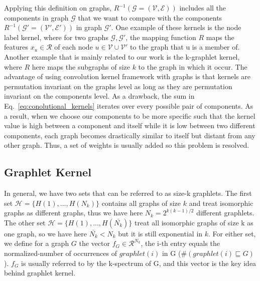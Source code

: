  Applying this definition on graphs, $R^{-1}(\mathcal{G}=(\mathcal{V},\mathcal{E}))$ includes all the components in graph $\mathcal{G}$  that we want to compare with the components $R^{-1}(\mathcal{G'}=(\mathcal{V}',\mathcal{E}'))$ in graph $\mathcal{G'}$. One example of these kernels is the node label kernel, where for two graphs $\mathcal{G}, \mathcal{G'}$, the mapping function $R$ maps the features $x_u\in \mathcal{R}$ of each node $u\in \mathcal{V}\cup \mathcal{V'}$ to the graph that u is a member of. Another example that is mainly related to our work is the k-graphlet kernel, where $R$ here maps the subgraphs of size $k$ to the graph in which it occur. The advantage of using convolution kernel framework with graphs is that kernels are permutation invariant on the graphs level as long as they are permutation invariant on the components level. 
 As a drawback, the sum in Eq.~\ref{eq:conolutional_kernels} iterates over every possible pair of components. As a result, when we choose our components to be more specific such that the kernel value is high between a component and itself while it is low between two different components, each graph becomes drastically similar to itself but distant from any other graph. Thus, a set of weights is usually added  so this problem is resolved.


\subsection{Graphlet Kernel}
\label{subsection: graphlet kernel}
In general, we have two sets that can be referred to as size-k graphlets. The first set $\mathcal{H}=\{H(1),..., H(N_k)\}$ contains all graphs of size $k$ and treat isomorphic graphs as different graphs, thus we have here $N_k=2^{k(k-1)/2}$ different graphlets. The other set $\mathcal{H}=\{H(1),..., H(\bar{N_k})\}$ treat all isomorphic graphs of size k as one graph, so we have here $\bar{N_k}<N_k$ but it is still exponential in $k$.
For either set, we define for a graph $G$ the vector $f_G\in \mathcal{R}^{N_k}$, the i-th entry equals the normalized-number of occurrences of $graphlet(i)$ in G ($\#(graphlet(i)\sqsubseteq G)$). $f_G$ is usually referred to by the k-spectrum of G, and this vector is the key idea behind graphlet kernel. 


